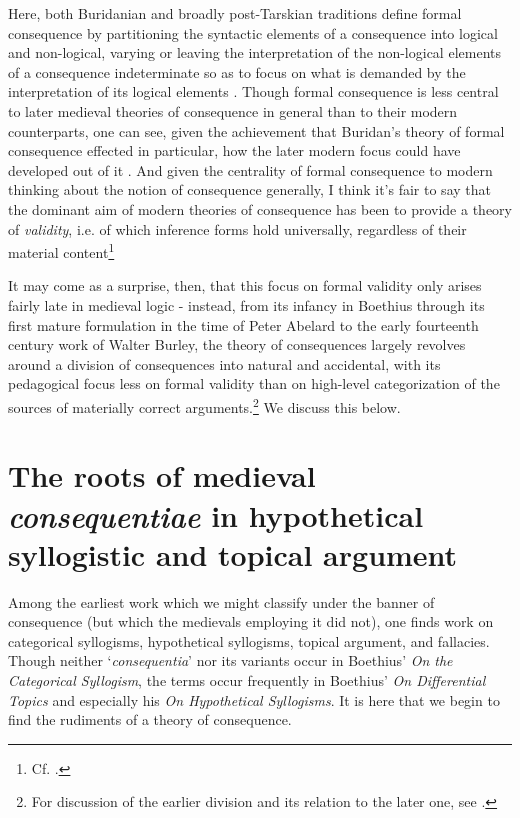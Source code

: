 \documentclass[a4paper, 11pt]{article}
\begin{document}
Here, both Buridanian and broadly post-Tarskian traditions define formal consequence by partitioning the syntactic elements of a consequence into logical and non-logical, varying or leaving the interpretation of the non-logical elements of a consequence indeterminate so as to focus on what is demanded by the interpretation of its logical elements \autocite[314-321]{DutilhNovaes2011}. Though formal consequence is less central to later medieval theories of consequence in general than to their modern counterparts, one can see, given the achievement that Buridan's theory of formal consequence effected in particular, how the later modern focus could have developed out of it \autocite{Archambault2018a}. And given the centrality of formal consequence to modern thinking about the notion of consequence generally, I think it's fair to say that the dominant aim of modern theories of consequence has been to provide a theory of \emph{validity}, i.e. of which inference forms hold universally, regardless of their material content\footnote{Cf. \autocite{Etchemendy2008,MacFarlane2000}.} 

It may come as a surprise, then, that this focus on formal validity only arises fairly late in medieval logic - instead, from its infancy in Boethius through its first mature formulation in the time of Peter Abelard to the early fourteenth century work of Walter Burley, the theory of consequences largely revolves around a division of consequences into natural and accidental, with its pedagogical focus less on formal validity than on high-level categorization of the sources of materially correct arguments.\footnote{For discussion of the earlier division and its relation to the later one, see \autocite{Martin2018,Martin2004,Archambault2018a}.} We discuss this below.


\section{The roots of medieval \emph{consequentiae} in hypothetical syllogistic and topical argument}
Among the earliest work which we might classify under the banner of consequence (but which the medievals employing it did not), one finds work on categorical syllogisms, hypothetical syllogisms, topical argument, and fallacies. Though neither `\emph{consequentia}' nor its variants occur in Boethius' \textit{On the Categorical Syllogism}, the terms occur frequently in Boethius' \emph{On Differential Topics} and especially his \emph{On Hypothetical Syllogisms}. It is here that we begin to find the rudiments of a theory of consequence. 
\end{document}
